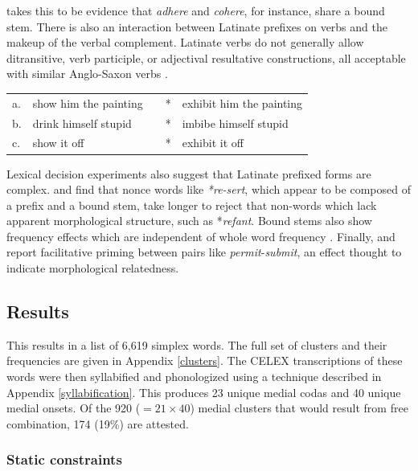 \noindent
\citeauthor{Aronoff1976} takes this to be evidence that \emph{adhere} and \emph{cohere}, for instance, share a bound stem.
There is also an interaction between Latinate prefixes on verbs and the makeup of the verbal complement. 
Latinate verbs do not generally allow ditransitive, verb participle, or adjectival resultative constructions, all acceptable with similar Anglo-Saxon verbs \citep{Gropen1989,Harley2009}.

\begin{example} 
\label{harley}
\begin{tabular}{l l l l@{} l}
a. & {show him the painting} & \alt{} & * & {exhibit him the painting} \\
b. & {drink himself stupid}  & \alt{} & * & {imbibe himself stupid}    \\
c. & {show it off}           & \alt{} & * & {exhibit it off}           \\
\end{tabular}
\end{example}

Lexical decision experiments also suggest that Latinate prefixed forms are complex. \citet{Taft1975,Taft1976} and \citet{Taft1986} find that nonce words like \emph{*re-sert}, which appear to be composed of a prefix and a bound stem, take longer to reject that non-words which lack apparent morphological structure, such as *\emph{refant}. 
Bound stems also show frequency effects which are independent of whole word frequency \citep{Taft1979,Taft2006}. 
Finally, \citet{Emmorey1989} and \citet{Forster2000} report facilitative priming between pairs like \emph{permit}-\emph{submit}, an effect thought to indicate morphological relatedness.

\subsection{Results}

This results in a list of 6,619 simplex words. 
The full set of clusters and their frequencies are given in Appendix \ref{clusters}.
The CELEX transcriptions of these words were then syllabified and phonologized using a technique described in Appendix \ref{syllabification}. 
This produces 23 unique medial codas and 40 unique medial onsets. 
Of the 920 ($= 21 \times 40$) medial clusters that would result from free combination, 174 (19\%) are attested. 

\subsubsection{Static constraints}

